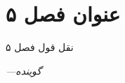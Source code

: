 \chapter{عنوان فصل ۵}
\setlength{\epigraphwidth}{0.85\textwidth}
\epigraph{نقل قول فصل ۵}{\textit{—گوینده}}
\setcounter{footnote}{0}